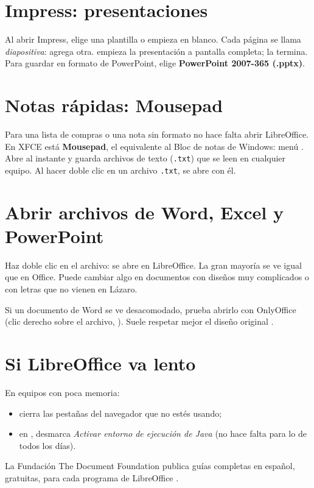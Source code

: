 \section{Impress: presentaciones}

Al abrir Impress, elige una plantilla o empieza en blanco. Cada página se
llama \emph{diapositiva}:  agrega
otra.  empieza la presentación a pantalla completa; 
la termina. Para guardar en formato de PowerPoint, elige
\textbf{PowerPoint 2007-365 (.pptx)}.

\section{Notas rápidas: Mousepad}

Para una lista de compras o una nota sin formato no hace falta abrir
LibreOffice. En XFCE está \textbf{Mousepad}, el equivalente al Bloc de notas
de Windows: menú . Abre al
instante y guarda archivos de texto (\texttt{.txt}) que se leen en cualquier
equipo. Al hacer doble clic en un archivo \texttt{.txt}, se abre con él.


\section{Abrir archivos de Word, Excel y PowerPoint}

Haz doble clic en el archivo: se abre en LibreOffice. La gran mayoría se
ve igual que en Office. Puede cambiar algo en documentos con diseños muy
complicados o con letras que no vienen en Lázaro.

\begin{consejo}
Si un documento de Word se ve desacomodado, prueba abrirlo con OnlyOffice
(clic derecho sobre el archivo, ). Suele respetar mejor el
diseño original \cite{onlyoffice-ayuda}.
\end{consejo}

\section{Si LibreOffice va lento}

En equipos con poca memoria:
\begin{itemize}
  \item cierra las pestañas del navegador que no estés usando;
  \item en , desmarca
        \emph{Activar entorno de ejecución de Java} (no hace falta para lo
        de todos los días).
\end{itemize}

\begin{nota}
La Fundación The Document Foundation publica guías completas en español,
gratuitas, para cada programa de LibreOffice \cite{libreoffice-guias}.
\end{nota}

\fuentes
